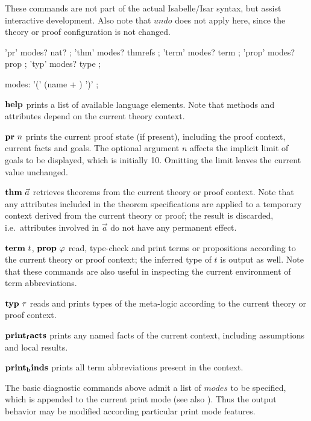 These commands are not part of the actual Isabelle/Isar syntax, but assist
interactive development.  Also note that $undo$ does not apply here, since the
theory or proof configuration is not changed.

\begin{rail}
  'pr' modes? nat?
  ;
  'thm' modes? thmrefs
  ;
  'term' modes? term
  ;
  'prop' modes? prop
  ;
  'typ' modes? type
  ;

  modes: '(' (name + ) ')'
  ;
\end{rail}

\begin{descr}
\item [${\mathord{\mathbf{help}}}$] prints a list of available language elements.
  Note that methods and attributes depend on the current theory context.
\item [${\mathord{\mathbf{pr}}}~n$] prints the current proof state (if present),
  including the proof context, current facts and goals.  The optional argument
  $n$ affects the implicit limit of goals to be displayed, which is initially
  10.  Omitting the limit leaves the current value unchanged.
\item [${\mathord{\mathbf{thm}}}~\vec a$] retrieves theorems from the current theory
  or proof context.  Note that any attributes included in the theorem
  specifications are applied to a temporary context derived from the current
  theory or proof; the result is discarded, i.e.\ attributes involved in $\vec
  a$ do not have any permanent effect.
\item [${\mathord{\mathbf{term}}}~t$, ${\mathord{\mathbf{prop}}}~\varphi$] read, type-check and
  print terms or propositions according to the current theory or proof
  context; the inferred type of $t$ is output as well.  Note that these
  commands are also useful in inspecting the current environment of term
  abbreviations.
\item [${\mathord{\mathbf{typ}}}~\tau$] reads and prints types of the meta-logic
  according to the current theory or proof context.
\item [${\mathord{\mathbf{print_facts}}}$] prints any named facts of the current
  context, including assumptions and local results.
\item [${\mathord{\mathbf{print_binds}}}$] prints all term abbreviations present in
  the context.
\end{descr}

The basic diagnostic commands above admit a list of $modes$ to be specified,
which is appended to the current print mode (see also \cite{isabelle-ref}).
Thus the output behavior may be modified according particular print mode
features.

